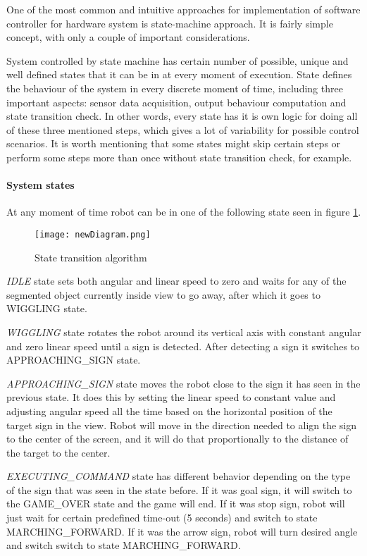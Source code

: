 
One of the most common and intuitive approaches for implementation of software controller for hardware system is state-machine approach. It is fairly simple concept, with only a couple of important considerations.

System controlled by state machine has certain number of possible, unique and well defined states that it can be in at every moment of execution. State defines the behaviour of the system in every discrete moment of time, including three important aspects: sensor data acquisition, output behaviour computation and state transition check. In other words, every state has it is own logic for doing all of these three mentioned steps, which gives a lot of variability for possible control scenarios. It is worth mentioning that some states might skip certain steps or perform some steps more than once without state transition check, for example.

\paragraph{System states}

At any moment of time robot can be in one of the following state seen in figure \ref{fig:algorithm-diagram}.

\begin{figure}[ht!]
	\centering
	\texttt{[image: newDiagram.png]}
	\caption{State transition algorithm}
	\label{fig:algorithm-diagram}
\end{figure}

\textit{IDLE} state sets both angular and linear speed to zero and waits for any of the segmented object currently inside view to go away, after which it goes to WIGGLING state.

\textit{WIGGLING} state rotates the robot around its vertical axis with constant angular and zero linear speed until a sign is detected. After detecting a sign it switches to APPROACHING\_SIGN state.

\textit{APPROACHING\_SIGN} state moves the robot close to the sign it has seen in the previous state. It does this by setting the linear speed to constant value and adjusting angular speed all the time based on the horizontal position of the target sign in the view. Robot will move in the direction needed to align the sign to the center of the screen, and it will do that proportionally to the distance of the target to the center.

\textit{EXECUTING\_COMMAND} state has different behavior depending on the type of the sign that was seen in the state before. If it was goal sign, it will switch to the GAME\_OVER state and the game will end. If it was stop sign, robot will just wait for certain predefined time-out (5 seconds) and switch to state MARCHING\_FORWARD. If it was the arrow sign, robot will turn desired angle and switch switch to state MARCHING\_FORWARD.

